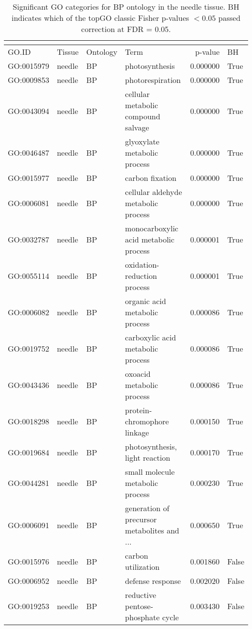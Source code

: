 \begin{longtable}{llllrl}
\caption{Significant GO categories for BP ontology in the needle tissue. BH indicates which of the topGO classic Fisher p-values $< 0.05$ passed correction at FDR = 0.05.}\\
\label{tab:go-needle-BP}\\
\toprule
GO.ID & Tissue & Ontology & Term & p-value & BH \\
\midrule
GO:0015979 & needle & BP &   photosynthesis  & 0.000000 &   True \\
GO:0009853 & needle & BP &   photorespiration  & 0.000000 &   True \\
GO:0043094 & needle & BP &   cellular metabolic compound salvage  & 0.000000 &   True \\
GO:0046487 & needle & BP &   glyoxylate metabolic process  & 0.000000 &   True \\
GO:0015977 & needle & BP &   carbon fixation  & 0.000000 &   True \\
GO:0006081 & needle & BP &   cellular aldehyde metabolic process  & 0.000000 &   True \\
GO:0032787 & needle & BP &   monocarboxylic acid metabolic process  & 0.000001 &   True \\
GO:0055114 & needle & BP &   oxidation-reduction process  & 0.000001 &   True \\
GO:0006082 & needle & BP &   organic acid metabolic process  & 0.000086 &   True \\
GO:0019752 & needle & BP &   carboxylic acid metabolic process  & 0.000086 &   True \\
GO:0043436 & needle & BP &   oxoacid metabolic process  & 0.000086 &   True \\
GO:0018298 & needle & BP &   protein-chromophore linkage  & 0.000150 &   True \\
GO:0019684 & needle & BP &   photosynthesis, light reaction  & 0.000170 &   True \\
GO:0044281 & needle & BP &   small molecule metabolic process  & 0.000230 &   True \\
GO:0006091 & needle & BP &   generation of precursor metabolites and ...  & 0.000650 &   True \\
GO:0015976 & needle & BP &   carbon utilization  & 0.001860 &   False \\
GO:0006952 & needle & BP &   defense response  & 0.002020 &   False \\
GO:0019253 & needle & BP &   reductive pentose-phosphate cycle  & 0.003430 &   False \\

\end{longtable}
